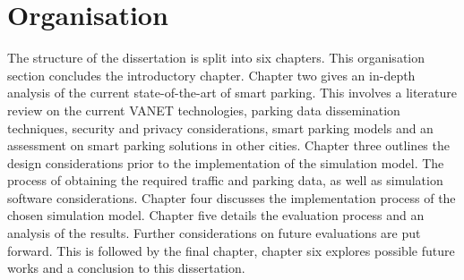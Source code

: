 \section{Organisation}
The structure of the dissertation is split into six chapters. This organisation section concludes the introductory chapter. Chapter two gives an in-depth analysis of the current state-of-the-art of smart parking. This involves a literature review on the current \ac{VANET} technologies, parking data dissemination techniques, security and privacy considerations, smart parking models and 
an assessment on smart parking solutions in other cities. Chapter three outlines the design considerations prior to the implementation of the simulation model. The process of obtaining the required traffic and parking data, as well as simulation software considerations. Chapter four discusses the implementation process of the chosen simulation model. Chapter five details the evaluation process and an analysis of the results. Further considerations on future evaluations are put forward. This is followed by the final chapter, chapter six explores possible future works and a conclusion to this dissertation.